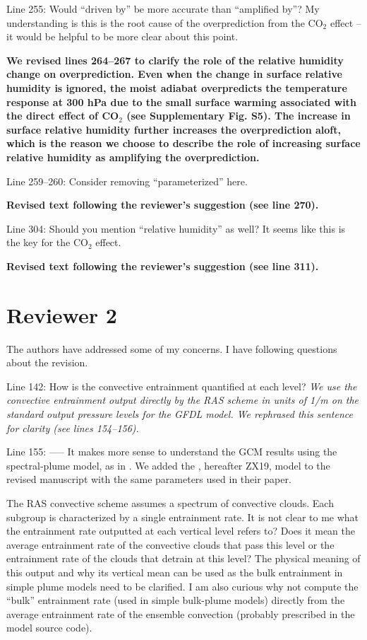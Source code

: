 \documentclass[11pt]{article}
\begin{document}
Line 255: Would ``driven by'' be more accurate than ``amplified by''? My understanding is this is the root cause of the overprediction from the CO\(_2\) effect -- it would be helpful to be more clear about this point.

\textbf{We revised lines 264--267 to clarify the role of the relative humidity change on overprediction. Even when the change in surface relative humidity is ignored, the moist adiabat overpredicts the temperature response at 300 hPa due to the small surface warming associated with the direct effect of CO\(_2\) (see Supplementary Fig. S5). The increase in surface relative humidity further increases the overprediction aloft, which is the reason we choose to describe the role of increasing surface relative humidity as amplifying the overprediction.}

Line 259--260: Consider removing ``parameterized'' here.

\textbf{Revised text following the reviewer's suggestion (see line 270).}

Line 304: Should you mention ``relative humidity'' as well? It seems like this is the key for the CO\(_2\) effect.

\textbf{Revised text following the reviewer's suggestion (see line 311).}

\clearpage
\section*{Reviewer 2}
\label{sec:org7d8539f}
The authors have addressed some of my concerns. I have following questions about the revision.

Line 142: How is the convective entrainment quantified at each level? \emph{We use the convective entrainment output directly by the RAS scheme in units of 1/m on the standard output pressure levels for the GFDL model. We rephrased this sentence for clarity (see lines 154--156).}

Line 155: ----- It makes more sense to understand the GCM results using the spectral-plume model, as in \cite{zhou2019}. We added the \cite{zhou2019}, hereafter ZX19, model to the revised manuscript with the same parameters used in their paper.

The RAS convective scheme assumes a spectrum of convective clouds. Each subgroup is characterized by a single entrainment rate. It is not clear to me what the entrainment rate outputted at each vertical level refers to? Does it mean the average entrainment rate of the convective clouds that pass this level or the entrainment rate of the clouds that detrain at this level? The physical meaning of this output and why its vertical mean can be used as the bulk entrainment in simple plume models need to be clarified. I am also curious why not compute the ``bulk'' entrainment rate (used in simple bulk-plume models) directly from the average entrainment rate of the ensemble convection (probably prescribed in the model source code).
\end{document}
